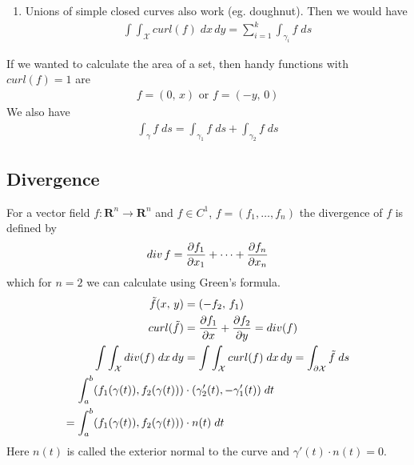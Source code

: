 \documentclass[8pt]{extarticle}
\newcommand{\R}{{\mathbb R}}
\newcommand{\X}{{\mathcal X}}
\newcommand{\ra}{{\rightarrow}}
\def\R{\mathbf{R}}
\begin{document}
\begin{multicols*}{3}
\begin{enumerate}[label=(\arabic*)]
    \item Unions of simple closed curves also work (eg. doughnut).
          Then we would have
          \begin{align*}
            \int \int_\X curl(f) \; dx \, dy = \sum_{i = 1}^k \int_{\gamma_i} f \; ds
          \end{align*}
  \end{enumerate}
  If we wanted to calculate the area of a set, then handy
  functions with $curl(f) = 1 $ are
  \begin{align*}
    f=(0, \, x) \text{ or } f = (-y, \, 0)
  \end{align*}
  We also have
  \begin{align*}
    \int_\gamma f \; ds = \int_{\gamma_1} f \; ds +\int_{\gamma_2} f \; ds
  \end{align*}
  \subsection{Divergence}
  For a vector field $f: \R^n \ra \R^n$ and $f \in C^1$,
  $f = (f_1, \dots, f_n)$ the divergence of $f$ is defined by
  \begin{align*}
    div \, f = \pdv{f_1}{x_1} + \dots + \pdv{f_n}{x_n}
  \end{align*}
  which for $n = 2$ we can calculate using Green's formula.
  \begin{align*}
    \tilde{f}(x, \, y)                          & = (-f_2, \, f_1)                                                        \\
    curl(\tilde{f})                             & = \pdv{f_1}{x} + \pdv{f_2}{y} = div(f)                                  \\
    \int \int_\X div(f) \; dx \, dy             & = \int \int_\X curl(f) \; dx \, dy = \int_{\partial \X} \tilde{f} \; ds \\
    \int_a^b (f_1(\gamma(t)), f_2(\gamma(t)))   & \cdot (\gamma_2'(t), - \gamma_1'(t)) \; dt                              \\
    = \int_a^b (f_1(\gamma(t)), f_2(\gamma(t))) & \cdot n(t) \; dt
  \end{align*}
  Here $n(t)$ is called the exterior normal to
  the curve and $\gamma'(t) \cdot n(t) = 0$.\\ \\

\end{multicols*}
\end{document}
